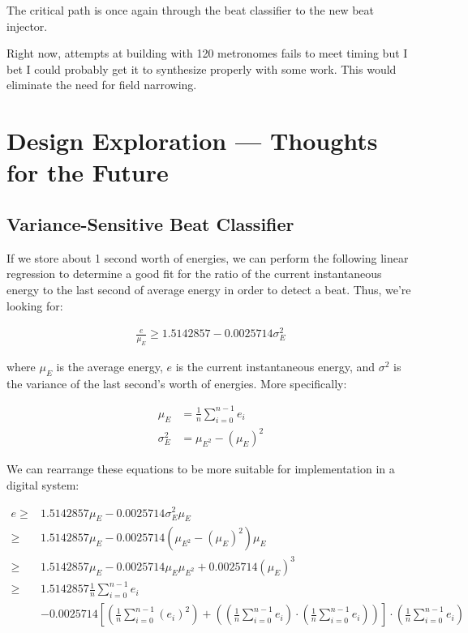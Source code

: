 \documentclass[letterpaper]{article}
\begin{document}
The critical path is once again through the beat classifier to the new beat
injector.

Right now, attempts at building with 120 metronomes fails to meet timing but I
bet I could probably get it to synthesize properly with some work.  This would
eliminate the need for field narrowing.


\section{Design Exploration --- Thoughts for the Future}
    \subsection{Variance-Sensitive Beat Classifier}
        
        If we store about 1 second worth of energies, we can perform the following
        linear regression to determine a good fit for the ratio of the current
        instantaneous energy to the last second of average energy in order to
        detect a beat.  Thus, we're looking for:

        \begin{align}
            \frac{e}{\mu_E} \geq 1.5142857 - 0.0025714 \sigma^2_E
        \end{align}

        where $\mu_E$ is the average energy, $e$ is the current instantaneous
        energy, and $\sigma^2$ is the variance of the last second's worth of
        energies.  More specifically:

        \begin{align}
            \mu_E &= \frac{1}{n} \sum_{i=0}^{n-1} e_i \\
            \sigma^2_E &= \mu_{E^2} - (\mu_E)^2
        \end{align}

        We can rearrange these equations to be more suitable for implementation in
        a digital system:

        \begin{align}
            e \geq & 1.5142857 \mu_E  - 0.0025714 \sigma^2_E \mu_E \\
            \geq & 1.5142857 \mu_E
                    - 0.0025714 (\mu_{E^2} - (\mu_E)^2) \mu_E \\
            \geq & 1.5142857 \mu_E
                    - 0.0025714 \mu_E \mu_{E^2} 
                    + 0.0025714 (\mu_E)^3 \\
            \geq & 1.5142857 \frac{1}{n} \sum_{i=0}^{n-1} e_i \\
                & - 0.0025714 \left[
                                    \left(\frac{1}{n} \sum_{i=0}^{n-1} (e_i)^2\right) +
                                    \left(
                                        \left(\frac{1}{n} \sum_{i=0}^{n-1} e_i\right) \cdot
                                        \left(\frac{1}{n} \sum_{i=0}^{n-1} e_i\right)
                                    \right)
                                \right] \cdot
                                \left(\frac{1}{n} \sum_{i=0}^{n-1} e_i\right)
        \end{align}
\end{document}
